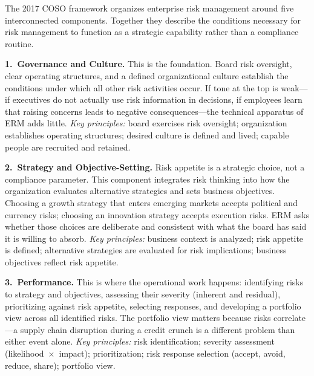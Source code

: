 \documentclass[11pt,openany]{book}
\begin{document}
\begin{regulatorynote}

The 2017 COSO framework organizes enterprise risk management around five interconnected components. Together they describe the conditions necessary for risk management to function as a strategic capability rather than a compliance routine.

\textbf{1.\ Governance and Culture.}
This is the foundation. Board risk oversight, clear operating structures, and a defined organizational culture establish the conditions under which all other risk activities occur. If tone at the top is weak---if executives do not actually use risk information in decisions, if employees learn that raising concerns leads to negative consequences---the technical apparatus of ERM adds little.
\emph{Key principles:} board exercises risk oversight; organization establishes operating structures; desired culture is defined and lived; capable people are recruited and retained.

\textbf{2.\ Strategy and Objective-Setting.}
Risk appetite is a strategic choice, not a compliance parameter. This component integrates risk thinking into how the organization evaluates alternative strategies and sets business objectives. Choosing a growth strategy that enters emerging markets accepts political and currency risks; choosing an innovation strategy accepts execution risks. ERM asks whether those choices are deliberate and consistent with what the board has said it is willing to absorb.
\emph{Key principles:} business context is analyzed; risk appetite is defined; alternative strategies are evaluated for risk implications; business objectives reflect risk appetite.

\textbf{3.\ Performance.}
This is where the operational work happens: identifying risks to strategy and objectives, assessing their severity (inherent and residual), prioritizing against risk appetite, selecting responses, and developing a portfolio view across all identified risks. The portfolio view matters because risks correlate---a supply chain disruption during a credit crunch is a different problem than either event alone.
\emph{Key principles:} risk identification; severity assessment (likelihood~$\times$~impact); prioritization; risk response selection (accept, avoid, reduce, share); portfolio view.


\end{regulatorynote}
\end{document}
